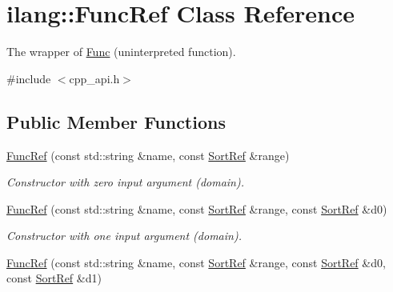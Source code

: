 \hypertarget{classilang_1_1_func_ref}{}\section{ilang\+:\+:Func\+Ref Class Reference}
\label{classilang_1_1_func_ref}


The wrapper of \mbox{\hyperlink{classilang_1_1_func}{Func}} (uninterpreted function).  




{\ttfamily \#include $<$cpp\+\_\+api.\+h$>$}

\subsection*{Public Member Functions}
\begin{DoxyCompactItemize}
\item 
\mbox{\label{classilang_1_1_func_ref_aab1a08c080833835a68e6a0e5a57757a}} 
\mbox{\hyperlink{classilang_1_1_func_ref_aab1a08c080833835a68e6a0e5a57757a}{Func\+Ref}} (const std\+::string \&name, const \mbox{\hyperlink{classilang_1_1_sort_ref}{Sort\+Ref}} \&range)
\begin{DoxyCompactList}\small\item\em Constructor with zero input argument (domain). \end{DoxyCompactList}\item 
\mbox{\label{classilang_1_1_func_ref_abcf1794534224e40f2850c1ff7f8d5ce}} 
\mbox{\hyperlink{classilang_1_1_func_ref_abcf1794534224e40f2850c1ff7f8d5ce}{Func\+Ref}} (const std\+::string \&name, const \mbox{\hyperlink{classilang_1_1_sort_ref}{Sort\+Ref}} \&range, const \mbox{\hyperlink{classilang_1_1_sort_ref}{Sort\+Ref}} \&d0)
\begin{DoxyCompactList}\small\item\em Constructor with one input argument (domain). \end{DoxyCompactList}\item 
\mbox{\label{classilang_1_1_func_ref_a9697bf77b050cb6d3f95595862517484}} 
\mbox{\hyperlink{classilang_1_1_func_ref_a9697bf77b050cb6d3f95595862517484}{Func\+Ref}} (const std\+::string \&name, const \mbox{\hyperlink{classilang_1_1_sort_ref}{Sort\+Ref}} \&range, const \mbox{\hyperlink{classilang_1_1_sort_ref}{Sort\+Ref}} \&d0, const \mbox{\hyperlink{classilang_1_1_sort_ref}{Sort\+Ref}} \&d1)

\end{DoxyCompactItemize}
